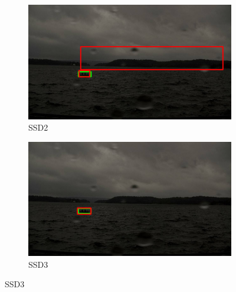 \begin{figure}[h!]
\begin{subfigure}{.5\textwidth}
  \centering
  \includegraphics[width=0.9\linewidth]{results/case_buildings/bigbox_bcbf/SSD2/selected_06_14_axis0019.jpg}
  \caption{SSD2}
  \label{fig:sfig1}
\end{subfigure}%
\begin{subfigure}{.5\textwidth}
  \centering
  \includegraphics[width=.9\linewidth]{results/case_buildings/bigbox_bcbf/SSD3/selected_06_14_axis0019.jpg}
  \caption{SSD3}
  \label{fig:sfig2}
\end{subfigure}


\end{figure}
